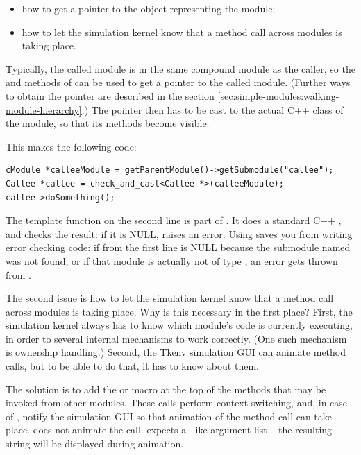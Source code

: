 \begin{itemize}
  \item how to get a pointer to the object representing the module;
  \item how to let the simulation kernel know that a method call across modules
     is taking place.
\end{itemize}

Typically, the called module is in the same compound module as the caller,
so the  and  methods of
 can be used to get a  pointer to the
called module. (Further ways to obtain the pointer are described
in the section \ref{sec:simple-modules:walking-module-hierarchy}.)
The  pointer then has to be cast to the actual C++ class
of the module, so that its methods become visible.

This makes the following code:

\begin{verbatim}
cModule *calleeModule = getParentModule()->getSubmodule("callee");
Callee *callee = check_and_cast<Callee *>(calleeModule);
callee->doSomething();
\end{verbatim}

The  template function on the second line
is part of {\opp}. It does a standard C++ ,
and checks the result: if it is NULL,  raises an {\opp} error.
Using  saves you from writing error checking
code: if  from the first line is NULL because
the submodule named  was not found, or if that
module is actually not of type , an error gets thrown
from .

The second issue is how to let the simulation kernel know that
a method call across modules is taking place. Why is this necessary
in the first place? First, the simulation kernel always has to know which
module's code is currently executing, in order to several internal
mechanisms to work correctly. (One such mechanism is ownership handling.)
Second, the Tkenv simulation GUI can animate method calls,
but to be able to do that, it has to know about them.

The solution is to add the  or 
macro at the top of the methods that may be invoked from other
modules. These calls perform context switching, and, in case of
, notify the simulation GUI so that animation
of the method call can take place. 
does not animate the call.  expects a
-like argument list -- the resulting string will
be displayed during animation.

